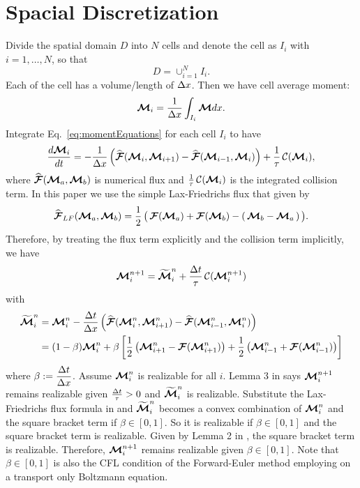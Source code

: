 \section{Spacial Discretization}\label{se:SpacialDiscretization}

Divide the spatial domain $D$ into $N$ cells and denote the cell as $I_{i}$ with $i = 1,\ldots,N$, so that
\begin{equation*}
D = \cup_{i = 1}^{N} I_{i}.
\end{equation*}
Each of the cell has a volume/length of $\Delta x$.
Then we have cell average moment:
\begin{equation}
\boldsymbol{\mathcal{M}}_{i} = \dfrac{1}{\Delta x} \int_{I_i}\boldsymbol{\mathcal{M}} dx.
\end{equation}
Integrate Eq.~\eqref{eq:momentEquations} for each cell $I_{i}$ to have
\begin{equation}
\dfrac{d \boldsymbol{\mathcal{M}}_{i}}{d t} = - \dfrac{1}{\Delta x} \left( \widehat{\boldsymbol{\mathcal{F}}}(\boldsymbol{\mathcal{M}}_{i},\boldsymbol{\mathcal{M}}_{i+1}) -  \widehat{\boldsymbol{\mathcal{F}}}(\boldsymbol{\mathcal{M}}_{i-1},\boldsymbol{\mathcal{M}}_{i})\right) + \frac{1}{\tau}\,\mathcal{C}(\boldsymbol{\mathcal{M}}_{i}),
\end{equation}
where $\widehat{\boldsymbol{\mathcal{F}}}(\boldsymbol{\mathcal{M}}_{a},\boldsymbol{\mathcal{M}}_{b})$ is numerical flux and $\frac{1}{\tau}\,\mathcal{C}(\boldsymbol{\mathcal{M}}_{i})$ is the integrated collision term.
In this paper we use the simple Lax-Friedrichs flux that given by
\begin{equation}
  \widehat{\boldsymbol{\mathcal{F}}}_{LF}(\boldsymbol{\mathcal{M}}_{a},\boldsymbol{\mathcal{M}}_{b})
  =\frac{1}{2}\,\big(\,\boldsymbol{\mathcal{F}}(\boldsymbol{\mathcal{M}}_{a})+\boldsymbol{\mathcal{F}}(\boldsymbol{\mathcal{M}}_{b})-(\,\boldsymbol{\mathcal{M}}_{b}-\boldsymbol{\mathcal{M}}_{a}\,)\,\big).
\end{equation}
Therefore, by treating the flux term explicitly and the collision term implicitly, we have
\begin{align*}
\boldsymbol{\mathcal{M}}_{i}^{n+1} = \widetilde{\boldsymbol{\mathcal{M}}}^{n}_{i} + \frac{\Delta t}{\tau}\,\mathcal{C}(\boldsymbol{\mathcal{M}}^{n+1}_{i})
\end{align*}
with
\begin{align*}
\widetilde{\boldsymbol{\mathcal{M}}}^{n}_{i} 
& = \boldsymbol{\mathcal{M}}_{i}^{n} - \dfrac{\Delta t}{\Delta x} \left( \widehat{\boldsymbol{\mathcal{F}}}(\boldsymbol{\mathcal{M}}^{n}_{i},\boldsymbol{\mathcal{M}}^{n}_{i+1}) -  \widehat{\boldsymbol{\mathcal{F}}}(\boldsymbol{\mathcal{M}}^{n}_{i-1},\boldsymbol{\mathcal{M}}^{n}_{i})\right)\nonumber \\
& = (1-\beta)\boldsymbol{\mathcal{M}}_{i}^{n} + \beta\left[ \frac{1}{2}\left( \boldsymbol{\mathcal{M}}^{n}_{i+1}-\boldsymbol{\mathcal{F}}(\boldsymbol{\mathcal{M}}^{n}_{i+1})\right)  + \frac{1}{2}\left( \boldsymbol{\mathcal{M}}^{n}_{i-1}+\boldsymbol{\mathcal{F}}(\boldsymbol{\mathcal{M}}^{n}_{i-1})\right)\right]
\end{align*}
where $\beta := \dfrac{\Delta t}{\Delta x}$.
Assume $\boldsymbol{\mathcal{M}}_{i}^{n}$ is realizable for all $i$. 
Lemma 3 in \cite{chu_etal_2018} says $\boldsymbol{\mathcal{M}}^{n+1}_{i}$ remains realizable given $\frac{\Delta t}{\tau} > 0$ and $\widetilde{\boldsymbol{\mathcal{M}}}^{n}_{i}$ is realizable.
Substitute the Lax-Friedrichs flux formula in and $\widetilde{\boldsymbol{\mathcal{M}}}^{n}_{i}$ becomes a convex combination of $\boldsymbol{\mathcal{M}}_{i}^{n}$ and the square bracket term if $\beta \in [0,1]$.
So it is realizable if $\beta \in [0,1]$ and the square bracket term is realizable.
Given by Lemma 2 in \cite{chu_etal_2018}, the square bracket term is realizable.
Therefore, $\boldsymbol{\mathcal{M}}^{n+1}_{i}$ remains realizable given $\beta \in [0,1]$.
Note that $\beta \in [0,1]$ is also the CFL condition of the Forward-Euler method employing on a transport only Boltzmann equation.
